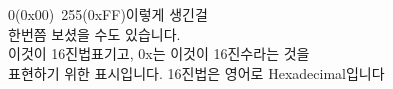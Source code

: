 \documentclass[preview]{standalone}
\begin{document}
\begin{center}
0(0x00)~255(0xFF)이렇게 생긴걸 \\한번쯤 보셨을 수도 있습니다.\\이것이 16진법표기고, 0x는 이것이 16진수라는 것을\\표현하기 위한 표시입니다. 16진법은 영어로 Hexadecimal입니다
\end{center}
\end{document}
